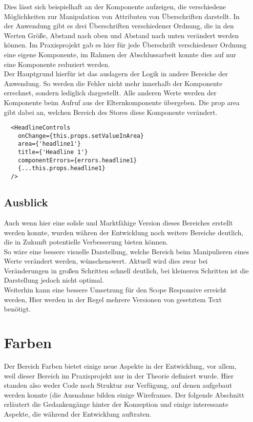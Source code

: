 Dies lässt sich beispielhaft an der Komponente aufzeigen, die verschiedene Möglichkeiten zur Manipulation von Attributen von Überschriften darstellt. In der Anwendung gibt es drei Überschriften verschiedener Ordnung, die in den Werten Größe,  Abstand nach oben und Abstand  nach unten verändert werden können. Im Praxisprojekt gab es hier für jede Überschrift verschiedener Ordnung eine eigene Komponente, im Rahmen der Abschlussarbeit konnte dies auf nur eine Komponente reduziert werden.\\
Der Hauptgrund hierfür ist das auslagern der Logik in andere Bereiche der Anwendung. So werden die Fehler nicht mehr innerhalb der Komponente errechnet, sondern lediglich dargestellt. Alle anderen Werte werden der Komponente beim Aufruf aus der Elternkomponente übergeben. Die prop area gibt dabei an, welchen Bereich des Stores diese Komponente verändert.

\begin{lstlisting}
  <HeadlineControls
  	onChange={this.props.setValueInArea}
  	area={'headline1'}
  	title={'Headline 1'}
  	componentErrors={errors.headline1}
  	{...this.props.headline1}
  />
\end{lstlisting}

\subsection{Ausblick}
Auch wenn hier eine solide und Marktfähige Version dieses Bereiches erstellt werden konnte, wurden währen der Entwicklung noch weitere Bereiche deutlich, die in Zukunft potentielle Verbesserung bieten können.\\
So wäre eine bessere visuelle Darstellung, welche Bereich beim Manipulieren eines Werte verändert werden, wünschenswert. Aktuell wird dies zwar bei Veränderungen in großen Schritten schnell deutlich, bei kleineren Schritten ist die Darstellung jedoch nicht optimal.\\
Weiterhin kann eine bessere Umsetzung für den Scope Responsive erreicht werden, Hier werden in der Regel mehrere Versionen von gesetztem Text benötigt.


\section{Farben}
Der Bereich Farben bietet einige neue Aspekte in der Entwicklung, vor allem, weil dieser Bereich im Praxisprojekt nur in der Theorie definiert wurde. Hier standen also weder Code noch Struktur zur Verfügung, auf denen aufgebaut werden konnte (die Ausnahme bilden einige Wireframes. Der folgende Abschnitt erläutert die Gedankengänge hinter der Konzeption und einige interessante Aspekte, die während der Entwicklung auftraten.

